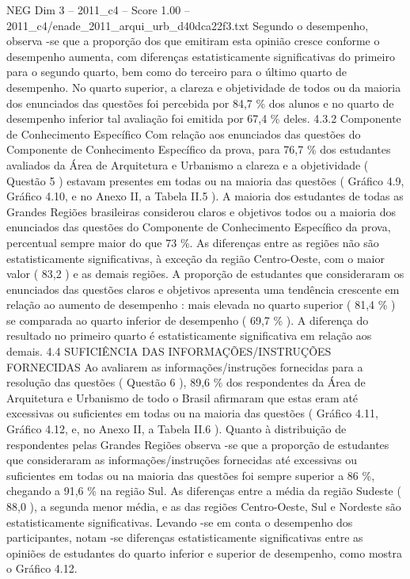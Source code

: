 \begin{textsample}{NEG Dim 3 – 2011\_c4 – Score 1.00 – 2011\_c4/enade\_2011\_arqui\_urb\_d40dca22f3.txt}
Segundo o desempenho, observa -se que a proporção dos que emitiram esta opinião cresce conforme o desempenho aumenta, com diferenças estatisticamente significativas do primeiro para o segundo quarto, bem como do terceiro para o último quarto de desempenho.
No quarto superior, a clareza e objetividade de todos ou da maioria dos enunciados das questões foi percebida por 84,7 \% dos alunos e no quarto de desempenho inferior tal avaliação foi emitida por 67,4 \% deles. 4.3.2 Componente de Conhecimento Específico Com relação aos enunciados das questões do Componente de Conhecimento Específico da prova, para 76,7 \% dos estudantes avaliados da Área de Arquitetura e Urbanismo a clareza e a objetividade ( Questão 5 ) estavam presentes em todas ou na maioria das questões ( Gráfico 4.9, Gráfico 4.10, e no Anexo II, a Tabela II.5 ).
A maioria dos estudantes de todas as Grandes Regiões brasileiras considerou claros e objetivos todos ou a maioria dos enunciados das questões do Componente de Conhecimento Específico da prova, percentual sempre maior do que 73 \%.
As diferenças entre as regiões não são estatisticamente significativas, à exceção da região Centro-Oeste, com o maior valor ( 83,2 ) e as demais regiões.
A proporção de estudantes que consideraram os enunciados das questões claros e objetivos apresenta uma tendência crescente em relação ao aumento de desempenho : mais elevada no quarto superior ( 81,4 \% ) se comparada ao quarto inferior de desempenho ( 69,7 \% ).
A diferença do resultado no primeiro quarto é estatisticamente significativa em relação aos demais. 4.4 SUFICIÊNCIA DAS INFORMAÇÕES/INSTRUÇÕES FORNECIDAS Ao avaliarem as informações/instruções fornecidas para a resolução das questões ( Questão 6 ), 89,6 \% dos respondentes da Área de Arquitetura e Urbanismo de todo o Brasil afirmaram que estas eram até excessivas ou suficientes em todas ou na maioria das questões ( Gráfico 4.11, Gráfico 4.12, e, no Anexo II, a Tabela II.6 ).
Quanto à distribuição de respondentes pelas Grandes Regiões observa -se que a proporção de estudantes que consideraram as informações/instruções fornecidas até excessivas ou suficientes em todas ou na maioria das questões foi sempre superior a 86 \%, chegando a 91,6 \% na região Sul.
As diferenças entre a média da região Sudeste ( 88,0 ), a segunda menor média, e as das regiões Centro-Oeste, Sul e Nordeste são estatisticamente significativas.
Levando -se em conta o desempenho dos participantes, notam -se diferenças estatisticamente significativas entre as opiniões de estudantes do quarto inferior e superior de desempenho, como mostra o Gráfico 4.12.

\end{textsample}
